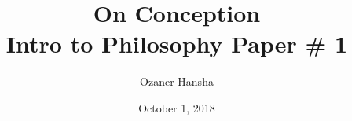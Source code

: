 \documentclass{article}
\begin{document}
\title{%
  On Conception \\
  \large Intro to Philosophy Paper \# 1}
\author{Ozaner Hansha}
\date{October 1, 2018}
\maketitle
\end{document}
